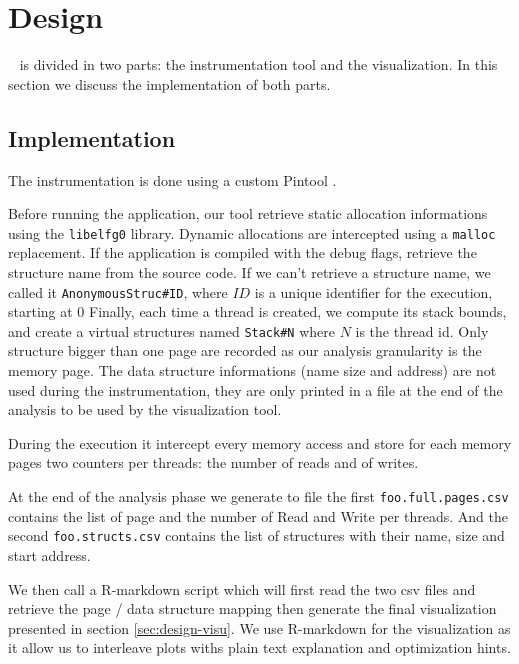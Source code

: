 
\section{Design}
\label{sec:design}

\TABARNAC~ is divided in two parts: the instrumentation tool and the
visualization.  In this section we discuss the implementation of both parts.

\subsection{Implementation}
\label{sec:design-impl}

The instrumentation is done using a custom Pintool \cite{Luk05Pin}.

Before running the application, our tool retrieve static allocation
informations using the \texttt{libelfg0} library. Dynamic allocations are
intercepted using a \texttt{malloc} replacement. If the application is
compiled with the debug flags, retrieve the structure name from the source
code. If we can't retrieve a structure name, we called it
\texttt{AnonymousStruc\#ID}, where $ID$ is a unique identifier for the
execution, starting at $0$ Finally, each time a thread is created, we compute
its stack bounds, and create a virtual structures named \texttt{Stack\#N} where
$N$ is the thread id. Only structure bigger than one page are recorded as our
analysis granularity is the memory page. The data structure informations (name
size and address) are not used during the instrumentation, they are only
printed in a file at the end of the analysis to be used by the visualization
tool.

During the execution it intercept every memory access and store for each
memory pages two counters per threads: the number of reads and of writes.

At the end of the analysis phase we generate to file the first
\texttt{foo.full.pages.csv} contains the list of page and the number of Read
and Write per threads. And the second \texttt{foo.structs.csv} contains the
list of structures with their name, size and start address.

We then call a R-markdown script which will first read the two csv files and
retrieve the page / data structure mapping then generate the final
visualization presented in section \ref{sec:design-visu}. We use R-markdown
for the visualization as it allow us to interleave plots withs plain text
explanation and optimization hints.

